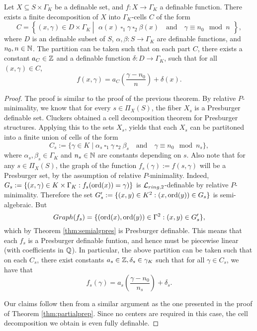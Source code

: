 \begin{prop}\label{prop:partialcd2}
Let $X \subseteq S \times \Gamma_K$ be a definable set, and $f: X \to \Gamma_K$ a definable function. There exists a finite decomposition of $X$ into $\Gamma_K$-cells $C$ of the form
\[C = \left\{(x,\gamma) \in D \times \Gamma_K \ \left| \ \begin{array}{l}\alpha(x)\ \square_1 \ \gamma \ \square_2 \  \beta(x)\quad \text{and}\quad \gamma \equiv n_0 \mod n \end{array} \right\}\right.,\]
where $D$ is an definable subset of $S$, $\alpha, \beta: S \to \Gamma_K$ are definable functions, and $n_0,n \in {\mathbb N}$. The partition can be taken such that on each part $C$, there exists a constant $a_{C} \in {\mathbb Z}$ and a definable function $\delta: D \to \Gamma_K$, such that for all $(x,\gamma) \in C$,
\[f(x,\gamma) = a_C \left(\frac{\gamma -n_0}{n}\right) + \delta(x).\]
 \end{prop}
\begin{proof}
The proof is similar to the proof of the previous theorem. By relative $P$-minimality, we know that for every $s \in \Pi_X(S)$, the fiber $X_s$ is a Presburger definable set. Cluckers \cite{clu-presb03} obtained a cell decomposition theorem for Presburger structures. Applying this to the sets $X_s$, yields that each
 $X_s$ can be partitoned into a finite union of cells of the form
\[C_s := \{ \gamma \in K \mid  \alpha_s\ \square_1 \ \gamma \ \square_2 \  \beta_s\quad \text{and}\quad \gamma \equiv n_0 \mod n_s\},\]
where $\alpha_s, \beta_s \in \Gamma_K$ and $n_s \in {\mathbb N}$ are constants depending on $s$. Also note that for any $s \in \Pi_X(S)$, the graph of the function $f_s(\gamma):= f(s,\gamma)$ will be a Presburger set, by the assumption of relative $P$-minimality. Indeed, $G_s:=\{(x,\gamma)\in K\times \Gamma_K: f_s(\operatorname{ord}(x))=\gamma)\}$ is $\mathcal{L}_{ring,2}$-definable by relative $P$-minimality. Therefore the set $G_s':=\{(x,y)\in K^2: (x,\operatorname{ord}(y))\in G_s\}$ is semi-algebraic. But 
\[Graph(f_s)=\{(\operatorname{ord}(x),\operatorname{ord}(y))\in \Gamma^2: (x,y)\in G_s'\},\]
which by Theorem \ref{thm:semialgpres} is Presburger definable. This means that each $f_s$ is a Presburger definable funtion, and hence  must be piecewise linear (with coefficients in ${\mathbb Q}$). In particular, the above partition can be taken such that on each $C_s$, there exist constants $a_s \in {\mathbb Z}, \delta_s \in \gamma_K$ such that for all $\gamma \in C_s$, we have that
\[f_s(\gamma) = a_s \left(\frac{\gamma -n_0}{n_s}\right) + \delta_s.\]

Our claims follow then from a similar argument as the one presented in the proof of Theorem
\ref{thm:partialprep}. Since no centers are required in this case, the cell decomposition we obtain is even fully definable.
\end{proof}


